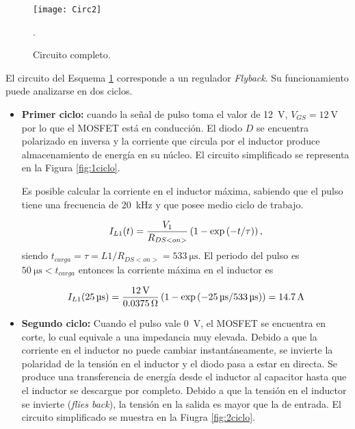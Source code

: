\begin{figure}[H]
	\centering
	\texttt{[image: Circ2]}
	\caption{Circuito completo.}.
	\label{fig:Circ2}
\end{figure}


El circuito del Esquema \ref{fig:Circ2} corresponde a un regulador \textit{Flyback}. Su funcionamiento puede analizarse en dos ciclos. 

\begin{itemize}
	\item \textbf{Primer ciclo:} cuando la señal de pulso toma el valor de \SI{12}{\volt}, $V_{GS}=\SI{12}{\volt}$ por lo que el MOSFET está en conducción. El diodo $D$ se encuentra polarizado en inversa y la corriente que circula por el inductor produce almacenamiento de energía en su núcleo. El circuito simplificado se representa en la Figura \ref{fig:1ciclo}.

		Es posible calcular la corriente en el inductor máxima, sabiendo que el pulso tiene una frecuencia de \SI{20}{\kilo\hertz} y que posee medio ciclo de trabajo.

		\begin{equation}
			\centering
			I_{L1}(t) = \frac{V_1}{R_{DS<on>}} \left(1-\exp{(-t/\tau)}\right),
		\end{equation}
		siendo $t_{carga} = \tau=L1/R_{DS<on>} = \SI{533}{\micro\second}$. El periodo del pulso es $\SI{50}{\micro\second} < t_{carga}$
entonces la corriente máxima en el inductor es

		\begin{equation}
			\centering
					I_{L1}(\SI{25}{\micro\second}) = \frac{\SI{12}{\volt}}{\SI{0.0375}{\ohm} } \left(1-\exp{(\SI{-25}{\micro\second}/ \SI{533}{\micro\second})}\right) = \SI{14.7}{\ampere}
		\end{equation}

	


\item \textbf{Segundo ciclo:}
	Cuando el pulso vale \SI{0}{\volt}, el MOSFET se encuentra en corte, lo cual equivale a una impedancia muy elevada. Debido a que la corriente en el inductor no puede cambiar instantáneamente, se invierte la polaridad de la tensión en el inductor y el diodo pasa a estar en directa. Se produce una transferencia de energía desde el inductor al capacitor hasta que el inductor se descargue por completo. Debido a que la tensión en el inductor se invierte (\textit{flies back}), la tensión en la salida es mayor que la de entrada. El circuito simplificado se muestra en la Fiugra \ref{fig:2ciclo}.


\end{itemize}
